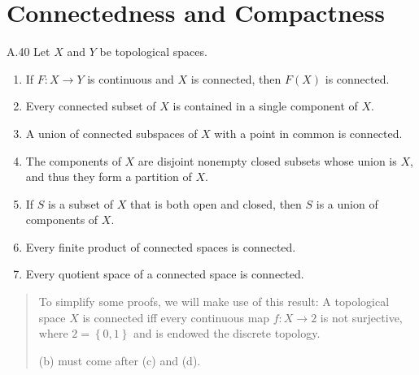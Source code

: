 \section{Connectedness and Compactness}

\begin{exercise}{A.40}
    Let \( X \) and \( Y \) be topological spaces.
    \begin{enumerate}[itemsep=0pt,label={(\alph*)}]
        \item If \( F: X \to Y \) is continuous and \( X \) is connected, then \( F(X) \) is connected.
        \item Every {\color{red}{nonempty}} connected subset of \( X \) is contained in a single component of \( X \).
        \item A union of connected subspaces of \( X \) with a point in common is connected.
        \item The components of \( X \) are disjoint nonempty closed subsets whose union is \( X \), and thus they form a partition of \( X \).
        \item If \( S \) is a subset of \( X \) that is both open and closed, then \( S \) is a union of components of \( X \).
        \item Every finite product of connected spaces is connected.
        \item Every quotient space of a connected space is connected.
    \end{enumerate}
\end{exercise}

\begin{quotation}
    To simplify some proofs, we will make use of this result: A topological space \( X \) is connected iff every continuous map \( f: X \to 2 \) is not surjective, where \( 2 = \left\{ 0, 1 \right\} \) and is endowed the discrete topology.

    (b) must come after (c) and (d).
\end{quotation}

